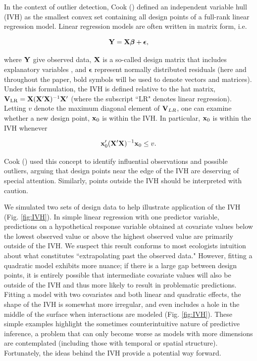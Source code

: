 \documentclass[12pt,english]{article}
\begin{document}
\begin{spacing}{1.9}
In the context of outlier detection, Cook (\citeyear{Cook1979}) defined an independent variable hull (IVH) as the smallest convex set containing all design points of a full-rank linear regression model.  Linear regression models are often written in matrix form, i.e.
\begin{linenomath*}
\begin{equation*}
  {\bf Y} = {\bf X} \boldsymbol{\beta} + \boldsymbol{\epsilon},
\end{equation*}
\end{linenomath*}
where ${\bf Y}$ give observed data, ${\bf X}$ is a so-called design matrix that includes explanatory variables \citep[see e.g.][]{Draper1966}, and $\boldsymbol{\epsilon}$ represent normally distributed residuals (here and throughout the paper, bold symbols will be used to denote vectors and matrices).
Under this formulation, the IVH is defined relative to the hat matrix, ${\bf V}_{\rm LR}={\bf X}({\bf X}^\prime{\bf X})^{-1}{\bf X}^\prime$ (where the subscript ``LR" denotes linear regression).  Letting $v$ denote the maximum diagonal element of ${\bf V}_{LR}$, one can examine whether a new design point, ${\bf x}_0$ is within the IVH.  In particular, ${\bf x}_0$ is within the IVH whenever
\begin{linenomath*}
\begin{equation}
  \label{eq:IVH}
  {\bf x}_0^\prime ({\bf X}^\prime{\bf X})^{-1}{\bf x}_0 \le v.
\end{equation}
\end{linenomath*}
Cook (\citeyear{Cook1979}) used this concept to identify influential observations and possible outliers, arguing that design points near the edge of the IVH are deserving of special attention.  Similarly, points outside the IVH should be interpreted with caution.

We simulated two sets of design data to help illustrate application of the IVH (Fig. \ref{fig:IVH}).  In simple linear regression with one predictor variable, predictions on a hypothetical response variable obtained at covariate values below the lowest observed value or above the highest observed value are primarily outside of the IVH.  We suspect this result conforms to most ecologists intuition about what constitutes ``extrapolating past the observed data."  However, fitting a quadratic model exhibits more nuance; if there is a large gap between design points, it is entirely possible that intermediate covariate values will also be outside of the IVH and thus more likely to result in problematic predictions.  Fitting a model with two covariates and both linear and quadratic effects, the shape of the IVH is somewhat more irregular, and even includes a hole in the middle of the surface when interactions are modeled (Fig. \ref{fig:IVH}).  These simple examples highlight the sometimes counterintuitive nature of predictive inference, a problem that can only become worse as models with more dimensions are contemplated (including those with temporal or spatial structure).  Fortunately, the ideas behind the IVH provide a potential way forward.


\end{spacing}
\end{document}

